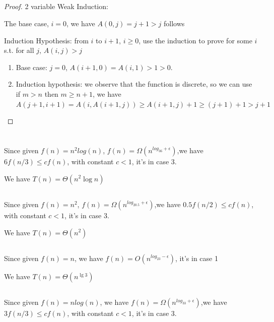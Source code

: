 \documentclass[a4paper]{article}
\begin{document}
\subsection{}
\begin{proof}
  2 variable Weak Induction:
  
  The base case, $i=0$, we have $A(0,j)=j+1>j$ follows
  
  Induction Hypothesis: from $i$ to $i+1$, $i\geq 0$, use the induction to prove for some $i$ s.t. for all $j$, $A(i,j)>j$
  \begin{enumerate}
    \item Base case: $j=0$, $A(i+1,0)=A(i,1)>1>0$.
    \item Induction hypothesis: we observe that the function is discrete, so we can use if $m>n$ then $m\geq n+1$, we have $A(j+1,i+1)=A(i,A(i+1,j))\geq A(i+1,j)+1\geq(j+1)+1>j+1$
  \end{enumerate}

\end{proof}

\section{}
\subsection{}
Since given $f(n)=n^2 log(n)$, $f(n)=\Omega(n^{log_36+\epsilon})$,we have $6f(n/3)\leq cf(n)$, with constant $c<1$, it's in case 3.

We have $T(n)=\Theta\left(n^2 \log n\right)$
\subsection{}
Since given $f(n)=n^2$, $f(n)=\Omega(n^{log_20.5+\epsilon})$,we have $0.5f(n/2)\leq cf(n)$, with constant $c<1$, it's in case 3.

We have $T(n)=\Theta\left(n^2 \right)$
\subsection{}
Since given $f(n)= n$, we have $f(n)=O(n^{log_23-\epsilon})$, it's in case 1

We have $T(n)=\Theta\left(n^{\lg 3}\right)$
\subsection{}
Since given $f(n)= nlog(n)$, we have $f(n)=\Omega(n^{log_33+\epsilon})$,we have $3f(n/3)\leq cf(n)$, with constant $c<1$, it's in case 3.
\end{document}
